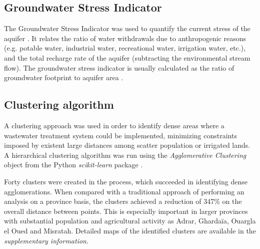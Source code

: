 \subsection{Groundwater Stress Indicator}
The Groundwater Stress Indicator was used to quantify the current stress of the aquifer \cite{Aqueductglobalmaps2015}. It relates the ratio of water withdrawals due to anthropogenic reasons (e.g. potable water, industrial water, recreational water, irrigation water, etc.), and the total recharge rate of the aquifer (subtracting the environmental stream flow). The groundwater stress indicator is usually calculated as the ratio of groundwater footprint to aquifer area \cite{RegionalGroundwaterStress2013}.

\subsection{Clustering algorithm}\label{Sc:clustering}
A clustering approach was used in order to identify dense areas where a wastewater treatment system could be implemented, minimizing constraints imposed by existent large distances among scatter population or irrigated lands. A hierarchical clustering  algorithm was run using the \textit{Agglomerative Clustering} object from the Python \textit{scikit-learn} package \cite{scikit-learn}.


Forty clusters were created in the process, which succeeded in identifying dense agglomerations. When compared with a traditional approach of performing an analysis on a province basis, the clusters achieved a reduction of 347\% on the overall distance between points. This is especially important in larger provinces with substantial population and agricultural activity as Adrar, Ghardaïa, Ouargla el Oued and Misratah. Detailed maps of the identified clusters are available in the \textit{supplementary information}.

